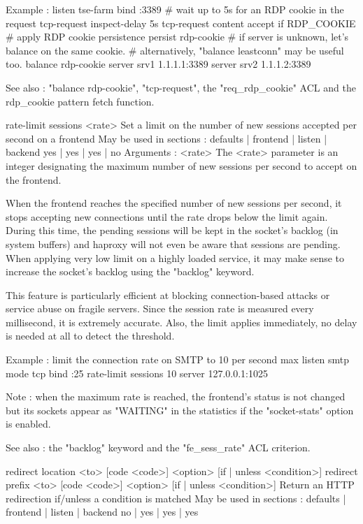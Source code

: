   Example :
        listen tse-farm
            bind :3389
            # wait up to 5s for an RDP cookie in the request
            tcp-request inspect-delay 5s
            tcp-request content accept if RDP_COOKIE
            # apply RDP cookie persistence
            persist rdp-cookie
            # if server is unknown, let's balance on the same cookie.
            # alternatively, "balance leastconn" may be useful too.
            balance rdp-cookie
            server srv1 1.1.1.1:3389
            server srv2 1.1.1.2:3389

  See also : "balance rdp-cookie", "tcp-request", the "req_rdp_cookie" ACL and
  the rdp_cookie pattern fetch function.


rate-limit sessions <rate>
  Set a limit on the number of new sessions accepted per second on a frontend
  May be used in sections :   defaults | frontend | listen | backend
                                 yes   |    yes   |   yes  |   no
  Arguments :
    <rate>    The <rate> parameter is an integer designating the maximum number
              of new sessions per second to accept on the frontend.

  When the frontend reaches the specified number of new sessions per second, it
  stops accepting new connections until the rate drops below the limit again.
  During this time, the pending sessions will be kept in the socket's backlog
  (in system buffers) and haproxy will not even be aware that sessions are
  pending. When applying very low limit on a highly loaded service, it may make
  sense to increase the socket's backlog using the "backlog" keyword.

  This feature is particularly efficient at blocking connection-based attacks
  or service abuse on fragile servers. Since the session rate is measured every
  millisecond, it is extremely accurate. Also, the limit applies immediately,
  no delay is needed at all to detect the threshold.

  Example : limit the connection rate on SMTP to 10 per second max
        listen smtp
            mode tcp
            bind :25
            rate-limit sessions 10
            server 127.0.0.1:1025

  Note : when the maximum rate is reached, the frontend's status is not changed
         but its sockets appear as "WAITING" in the statistics if the
         "socket-stats" option is enabled.

  See also : the "backlog" keyword and the "fe_sess_rate" ACL criterion.


redirect location <to> [code <code>] <option> [{if | unless} <condition>]
redirect prefix   <to> [code <code>] <option> [{if | unless} <condition>]
  Return an HTTP redirection if/unless a condition is matched
  May be used in sections :   defaults | frontend | listen | backend
                                 no    |    yes   |   yes  |   yes

